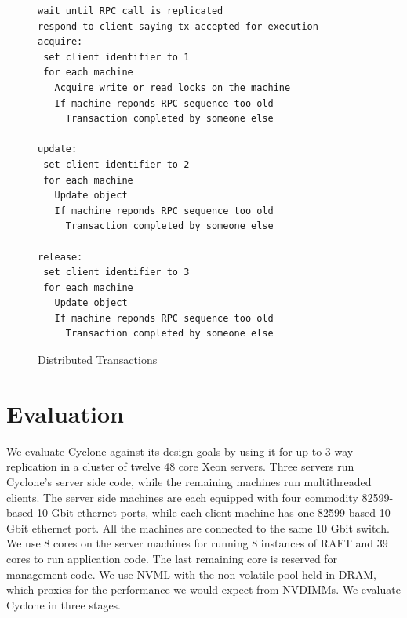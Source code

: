 \documentclass[letterpaper,twocolumn,10pt]{article}
\begin{document}
\begin{figure}
{ \scriptsize
\begin{verbatim}
wait until RPC call is replicated
respond to client saying tx accepted for execution
acquire:
 set client identifier to 1
 for each machine
   Acquire write or read locks on the machine
   If machine reponds RPC sequence too old
     Transaction completed by someone else

update:
 set client identifier to 2
 for each machine
   Update object
   If machine reponds RPC sequence too old
     Transaction completed by someone else
 
release:
 set client identifier to 3
 for each machine
   Update object
   If machine reponds RPC sequence too old
     Transaction completed by someone else
\end{verbatim}
}
\caption{Distributed Transactions}
\label{fig:dist_tx}
\end{figure}

\section{Evaluation}
We evaluate Cyclone against its design goals by using it for up to 3-way
replication in a cluster of twelve 48 core Xeon servers. Three servers run
Cyclone's server side code, while the remaining machines run multithreaded
clients. The server side machines are each equipped with four commodity
82599-based 10 Gbit ethernet ports, while each client machine has one
82599-based 10 Gbit ethernet port. All the machines are connected to the same 10
Gbit switch. We use 8 cores on the server machines for running 8 instances of
RAFT and 39 cores to run application code. The last remaining core is reserved
for management code. We use NVML with the non volatile pool held in DRAM, which
proxies for the performance we would expect from NVDIMMs. We evaluate Cyclone in
three stages.
\end{document}
